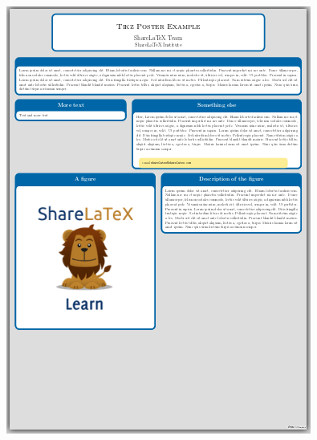 \documentclass[25pt, a0paper, portrait]{tikzposter}
\begin{document}
\begin{columns}
    {
	\begin{tikzfigure}
	    \includegraphics[width=\linewidth]{Tikzposter_theme/Default}
	\end{tikzfigure}
    }
    {
	\begin{tikzfigure}

\end{tikzfigure}}
\end{columns}
\end{document}
